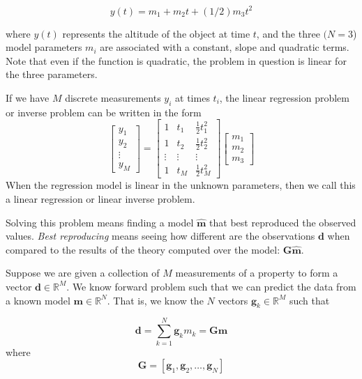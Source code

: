 \documentclass{article}
\newcommand{\real}{\mathbb{R}}
\begin{document}
\begin{equation}
y(t) = m_1 + m_2 t + (1/2) m_3 t^2
\end{equation}

where $y(t)$ represents the altitude of the object at time $t$, and the three $(N=3$) model parameters $m_i$ are associated with a constant, slope and quadratic terms. Note that even if the function is quadratic, the problem in question is linear for the three parameters. 

If we have $M$ discrete measurements $y_i$ at times $t_i$, the linear regression problem or inverse problem can be written in the form
\begin{equation}
\left[
\begin{array}{c}
  y_1   \\
  y_2   \\
  \vdots \\
  y_M
\end{array}
\right] = 
\left[
\begin{array}{ccc}
  1 & t_1 & {\scriptstyle{\frac{1}{2}}}t_1^2 \\
  1  &t_2 &  {\scriptstyle{\frac{1}{2}}}t_2^2\\
  \vdots & \vdots  & \vdots\\
  1 & t_M &  {\scriptstyle{\frac{1}{2}}}t_M^2
\end{array}
\right]
\left[
\begin{array}{c}
  m_1   \\
  m_2    \\
  m_3
\end{array}
\right] 
\end{equation}
When the regression model is linear in the unknown parameters, then we call this a linear regression or linear inverse problem. 

Solving this problem means finding a model $\mathbf{\hat{m}}$ that best reproduced the observed values. \emph{Best reproducing} means seeing how different are the observations $\mathbf{d}$ when compared to the results of the theory computed over the model: $\mathbf{G} \mathbf{\hat{m}}$.

Suppose we are given a collection of $M$ measurements of a property to
form a vector $\mathbf{d} \in \real^M$. We know forward problem such
that we can predict the data from a known model $\mathbf{m} \in
\real^N$. That is, we know the $N$ vectors $\mathbf{g}_k \in \real^M$
such that   

\begin{equation}
\mathbf{d} = \sum_{k=1}^{N} \mathbf{g}_k m_k = \mathbf{G} \mathbf{m}
\end{equation}
where
\begin{equation}
\mathbf{G} = \left[ \mathbf{g}_1, \mathbf{g}_2, \dots, \mathbf{g}_N \right] 
\end{equation}
\end{document}
